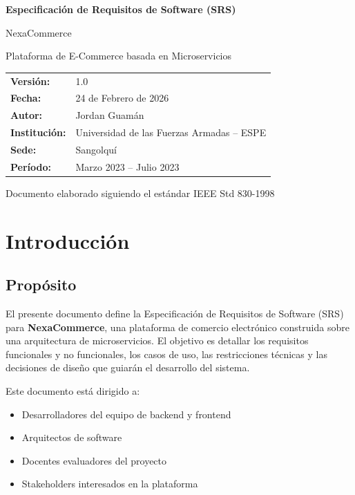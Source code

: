 \documentclass[12pt,a4paper]{article}
\begin{document}
\begin{titlepage}
\centering
\vspace*{2cm}
{\Huge\bfseries Especificaci\'on de Requisitos de Software (SRS)\par}
\vspace{1cm}
{\LARGE\textcolor{azulprimario}{NexaCommerce}\par}
\vspace{0.5cm}
{\large Plataforma de E-Commerce basada en Microservicios\par}
\vspace{2cm}
\begin{tabular}{ll}
\textbf{Versi\'on:} & 1.0 \\
\textbf{Fecha:} & 24 de Febrero de 2026 \\
\textbf{Autor:} & Jordan Guam\'an \\
\textbf{Instituci\'on:} & Universidad de las Fuerzas Armadas -- ESPE \\
\textbf{Sede:} & Sangolqu\'i \\
\textbf{Per\'iodo:} & Marzo 2023 -- Julio 2023 \\
\end{tabular}
\vfill
{\small Documento elaborado siguiendo el est\'andar IEEE Std 830-1998}
\end{titlepage}

\tableofcontents
\newpage

\section{Introducci\'on}

\subsection{Prop\'osito}
El presente documento define la Especificaci\'on de Requisitos de Software (SRS) para \textbf{NexaCommerce}, una plataforma de comercio electr\'onico construida sobre una arquitectura de microservicios. El objetivo es detallar los requisitos funcionales y no funcionales, los casos de uso, las restricciones t\'ecnicas y las decisiones de dise\~no que guiar\'an el desarrollo del sistema.

Este documento est\'a dirigido a:
\begin{itemize}
    \item Desarrolladores del equipo de backend y frontend
    \item Arquitectos de software
    \item Docentes evaluadores del proyecto
    \item Stakeholders interesados en la plataforma
\end{itemize}
\end{document}
